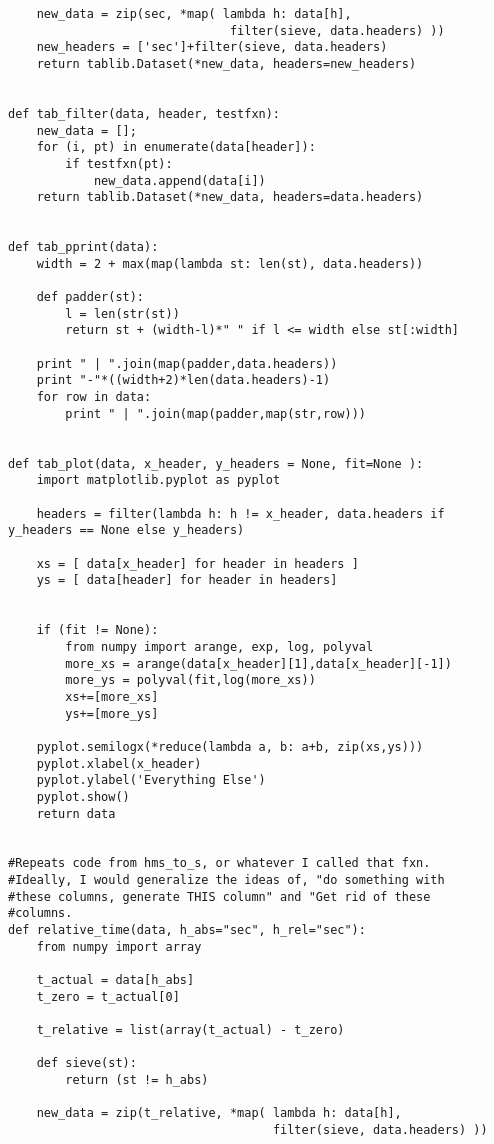\begin{verbatim}
    new_data = zip(sec, *map( lambda h: data[h],
                               filter(sieve, data.headers) ))
    new_headers = ['sec']+filter(sieve, data.headers)
    return tablib.Dataset(*new_data, headers=new_headers)


def tab_filter(data, header, testfxn):
    new_data = [];
    for (i, pt) in enumerate(data[header]):
        if testfxn(pt):
            new_data.append(data[i])
    return tablib.Dataset(*new_data, headers=data.headers)


def tab_pprint(data):
    width = 2 + max(map(lambda st: len(st), data.headers))

    def padder(st):
        l = len(str(st))
        return st + (width-l)*" " if l <= width else st[:width]

    print " | ".join(map(padder,data.headers))
    print "-"*((width+2)*len(data.headers)-1)
    for row in data:
        print " | ".join(map(padder,map(str,row)))


def tab_plot(data, x_header, y_headers = None, fit=None ):
    import matplotlib.pyplot as pyplot

    headers = filter(lambda h: h != x_header, data.headers if y_headers == None else y_headers)

    xs = [ data[x_header] for header in headers ]
    ys = [ data[header] for header in headers]


    if (fit != None):
        from numpy import arange, exp, log, polyval
        more_xs = arange(data[x_header][1],data[x_header][-1])
        more_ys = polyval(fit,log(more_xs))
        xs+=[more_xs]
        ys+=[more_ys]

    pyplot.semilogx(*reduce(lambda a, b: a+b, zip(xs,ys)))
    pyplot.xlabel(x_header)
    pyplot.ylabel('Everything Else')
    pyplot.show()
    return data


#Repeats code from hms_to_s, or whatever I called that fxn.
#Ideally, I would generalize the ideas of, "do something with
#these columns, generate THIS column" and "Get rid of these
#columns.
def relative_time(data, h_abs="sec", h_rel="sec"):
    from numpy import array

    t_actual = data[h_abs]
    t_zero = t_actual[0]

    t_relative = list(array(t_actual) - t_zero)

    def sieve(st):
        return (st != h_abs)

    new_data = zip(t_relative, *map( lambda h: data[h],
                                     filter(sieve, data.headers) ))


\end{verbatim}
